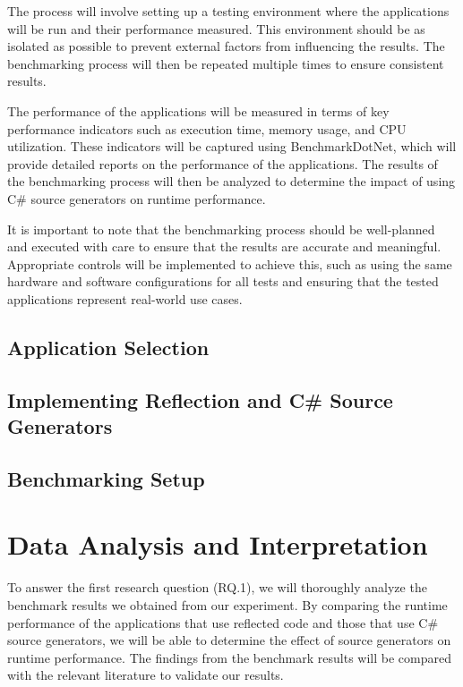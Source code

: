 The process will involve setting up a testing environment where the applications will be run and their performance measured. This environment should be as isolated as possible to prevent external factors from influencing the results. The benchmarking process will then be repeated multiple times to ensure consistent results.

The performance of the applications will be measured in terms of key performance indicators such as execution time, memory usage, and CPU utilization. These indicators will be captured using BenchmarkDotNet, which will provide detailed reports on the performance of the applications. The results of the benchmarking process will then be analyzed to determine the impact of using C\# source generators on runtime performance.

It is important to note that the benchmarking process should be well-planned and executed with care to ensure that the results are accurate and meaningful. Appropriate controls will be implemented to achieve this, such as using the same hardware and software configurations for all tests and ensuring that the tested applications represent real-world use cases.

\subsection{Application Selection}

\subsection{Implementing Reflection and C\# Source Generators}

\subsection{Benchmarking Setup}

\section{Data Analysis and Interpretation}

To answer the first research question (RQ.1), we will thoroughly analyze the benchmark results we obtained from our experiment. By comparing the runtime performance of the applications that use reflected code and those that use C\# source generators, we will be able to determine the effect of source generators on runtime performance. The findings from the benchmark results will be compared with the relevant literature to validate our results.

